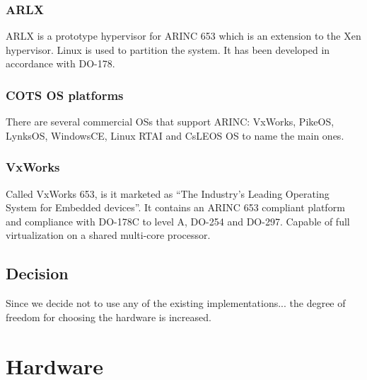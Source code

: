 \subsubsection{ARLX}
ARLX is a prototype hypervisor for ARINC 653 which is an extension to the Xen hypervisor.
Linux is used to partition the system.
It has been developed in accordance with DO-178.

\subsubsection{COTS OS platforms}
There are several commercial OSs that support ARINC:
VxWorks, PikeOS, LynksOS, WindowsCE, Linux RTAI and CsLEOS OS to name the main ones.

\subsubsection{VxWorks}
Called VxWorks 653, is it marketed as ``The Industry's Leading Operating System for Embedded devices''.
It contains an ARINC 653 compliant platform and compliance with DO-178C to level A, DO-254 and DO-297.
Capable of full virtualization on a shared multi-core processor.

\subsection{Decision}
Since we decide not to use any of the existing implementations...
the degree of freedom for choosing the hardware is increased.
\section{Hardware}

